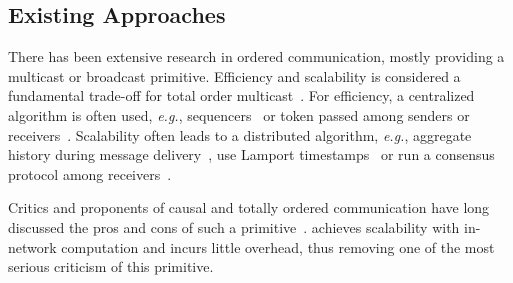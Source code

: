 \subsection{Existing Approaches}
\label{subsec:existing-approaches}

There has been extensive research in ordered communication, mostly providing a multicast or broadcast primitive.
Efficiency and scalability is considered a fundamental trade-off for total order multicast~\cite{defago2004total}.
For efficiency, a centralized algorithm is often used, \textit{e.g.}, sequencers~\cite{eris} or token passed among senders or receivers~\cite{rajagopalan1989token,kim1997total,ekwall2004token}.
Scalability often leads to a distributed algorithm, \textit{e.g.}, aggregate history during message delivery~\cite{chandra1996unreliable}, use Lamport timestamps~\cite{lamport1978time} or run a consensus protocol among receivers~\cite{lamport1998part}.

Critics and proponents of causal and totally ordered communication have long discussed the pros and cons of such a primitive~\cite{cheriton1994understanding,birman1994response,van1994bother}. 
\sys achieves scalability with in-network computation and incurs little overhead, thus removing one of the most serious criticism of this primitive.

